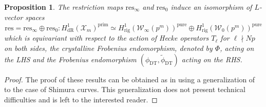 \documentclass[a4paper,11pt]{amsart}
\numberwithin{equation}{section}
\theoremstyle{plain}
\newtheorem{proposition}[theorem]{Proposition}
\theoremstyle{definition}
\theoremstyle{remark}
\newcommand{\res}{\mathrm{res}}
\begin{document}
\begin{proposition}\label{EB}
The restriction maps $\mathrm{res}_\infty$ and $\mathrm{res}_0$ induce an isomorphism 
of $L$-vector spaces 
\[\res=\res_\infty\oplus\res_0:H^1_\mathrm{dR}(\mathscr{X}_m)^\mathrm{prim}\simeq H^1_\mathrm{rig}(\mathcal{W}_\infty(p^m))^\mathrm{pure}\oplus H^1_\mathrm{rig}(\mathcal{W}_0(p^m))^\mathrm{pure}\]
which is equivariant with respect to the action of Hecke operators $T_\ell$ for $\ell\nmid Np$ on both sides, the crystalline Frobenius endomorphism, denoted by $\Phi$, acting on the LHS and the Frobenius endomorphism $(\phi_{\mathrm{DT}},\widetilde{\phi}_\mathrm{DT})$ acting on the RHS. 
\end{proposition}

\begin{proof}
The proof of these results can be obtained as in \cite[\S4.4]{EmBr} using a generalization of  \cite[Theorem 2.1]{Colemanhigher} to the case of Shimura curves. This generalization does not present technical difficulties and is left to the interested reader. 
\end{proof}
\end{document}
